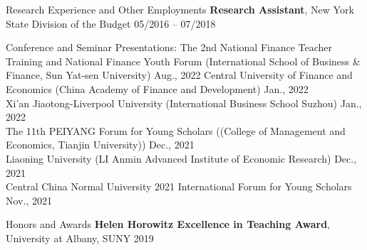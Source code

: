 \documentclass{resume_liang} %
\begin{document}
\begin{rSection}{Research Experience and Other Employments}
{\bf Research Assistant}{, New York State Division of the Budget} \hfill {05/2016 -- 07/2018}
\vspace{0.1cm}\\
\end{rSection}
\bigskip  



\begin{rSection}{Conference and Seminar Presentations:} 
{The 2nd National Finance Teacher Training and National Finance Youth Forum (International School of Business \& Finance, Sun Yat-sen University)} \hfill{Aug., 2022} 
{Central University of Finance and Economics (China Academy of Finance and Development)} \hfill{Jan., 2022}  
\vspace{0.1cm}\\
{Xi'an Jiaotong-Liverpool University (International Business School Suzhou)} \hfill{Jan., 2022}  
\vspace{0.1cm}\\ 
{The 11th PEIYANG Forum for Young Scholars ((College of Management and Economics, Tianjin University))} \hfill{Dec., 2021}  
\vspace{0.1cm}\\ 
{Liaoning University (LI Anmin Advanced Institute of Economic Research)} \hfill{Dec., 2021}  
\vspace{0.1cm}\\ 
{Central China Normal University 2021 International Forum for Young Scholars} \hfill{Nov., 2021}  
\vspace{0.1cm}\\
\end{rSection}
\bigskip  



\begin{rSection}{Honors and Awards} 
{\bf Helen Horowitz Excellence in Teaching Award}{, University at Albany, SUNY} \hfill{2019}  
\vspace{0.1cm} \\
\end{rSection}
\bigskip  
\end{document}
